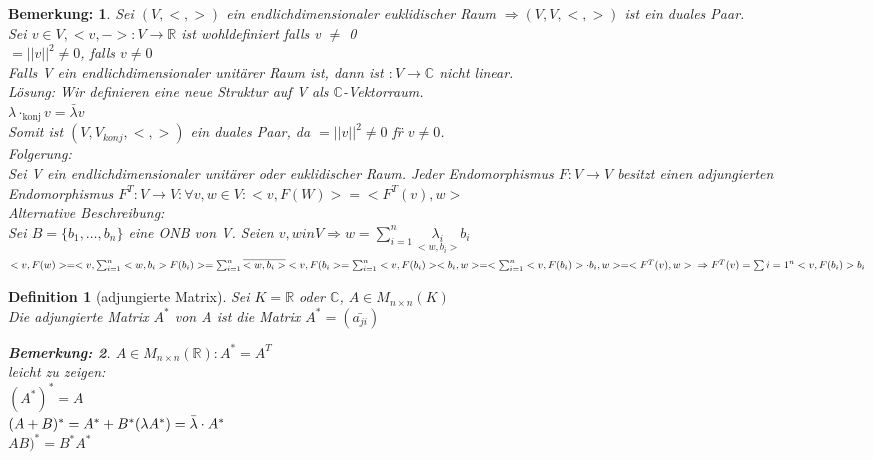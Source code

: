 \documentclass{report}
\newcommand{\lb}{\lambda}
\newcommand{\R}{\mathbb{R}}
\newcommand{\C}{\mathbb{C}}
\theoremstyle{customrem}
\newtheorem*{bemerkung}{Bemerkung\textnormal:}
\theoremstyle{customdef}
\newtheorem{definition}{Definition}[chapter]
\theoremstyle{customenv}
\begin{document}
\begin{bemerkung}
  Sei \((V, <, >)\) ein endlichdimensionaler euklidischer Raum
  \(\Rightarrow (V, V, <, >)\) ist ein duales Paar.\\
  Sei \(v \in V, <v, ->: V \to \R\) ist wohldefiniert falls v \(\neq\) 0\\
  \(<,v, v> = ||v||^2 \neq 0\), falls \(v \neq 0\)\\
  Falls V ein endlichdimensionaler unit\"arer Raum ist, dann ist
  \(<, -> : V \to \C\) nicht linear.\\
  L\"osung: Wir definieren eine neue Struktur auf V als \(\C\)-Vektorraum.\\
  \(\lb \cdot_{\text{konj}} v = \bar{\lb} v\)\\
  Somit ist \((V, V_{konj}, <, >)\) ein duales Paar, da
  \(<v, v> = ||v||^2 \neq 0\) f\"r \(v \neq 0\).\\
  Folgerung:\\
  Sei V ein endlichdimensionaler unit\"arer oder euklidischer Raum. 
  Jeder Endomorphismus \(F : V \to V\) besitzt einen adjungierten Endomorphismus
  \(F^T : V \to V : \forall v, w \in V : <v, F(W)> = <F^T(v), w>\)\\
  Alternative Beschreibung:\\
  Sei \(B = \{b_1, \dots, b_n\}\) eine ONB von V. Seien
  \(v, w in V \Rightarrow w = \sum_{i=1}^n \underset{<w, b_i>}{\lb_i} b_i\)\\
  \(<v, F(w)>
  = <v, \sum_{i=1}^n <w, b_i> F(b_i)>
  = \sum_{i=1}^n \overline{<w, b_i>}<v, F(b_i> 
  = \sum_{i=1}^n <v, F(b_i)><b_i, w>
  = <\sum_{i=1}^n<v, F(b_i)> \cdot b_i, w>
  = <F^T(v), w>\\
  \Rightarrow F^T(v) = \sum{i=1}^n <v, F(b_i)> b_i\)
\end{bemerkung}

\begin{definition}[adjungierte Matrix]
  Sei \(K = \R\) oder \(\C\), \(A \in M_{n \times n}(K)\)\\
  Die adjungierte Matrix \(A^*\) von A ist die Matrix \(A^* = (\bar{a_{ji}})\)
  \begin{bemerkung}
    \(A \in M_{n \times n}(\R) : A^* = A^T\)\\
    leicht zu zeigen:\\
    \((A^*)^* = A\)\\
    \((A + B)^* = A^* + B^*\\
    (\lb A^*) = \bar\lb \cdot A^*\)\\
    \(A B)^* = B^* A^*\)
  \end{bemerkung}
\end{definition}


\newpage
\renewcommand{\listtheoremname}{Satz- und Definitionsverzeichnis}
\newpage
\printindex
\end{document}
